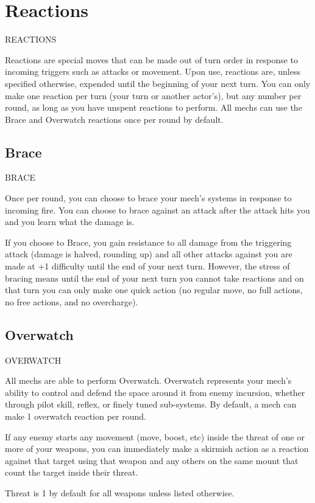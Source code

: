 \section{Reactions}
                                        REACTIONS  

Reactions are special moves that can be made out of turn order in response to incoming triggers  
such as attacks or movement. Upon use, reactions are, unless specified otherwise, expended  
until the beginning of your next turn. You can only make one reaction per turn (your turn or  
another actor’s), but any number per round, as long as you have unspent reactions to perform.  
All mechs can use the Brace and Overwatch reactions once per round by default.
 
\subsection{Brace}
                                                  BRACE  

Once per round, you can choose to brace your mech’s systems in response to incoming fire. You  
can choose to brace against an attack after the attack hits you and you learn what the damage  
is.
 

If you choose to Brace, you gain resistance to all damage from the triggering attack (damage is  
halved, rounding up) and all other attacks against you are made at +1 difficulty until the end of  
your next turn. However, the stress of bracing means until the end of your next turn you cannot  
take reactions and on that turn you can only make one quick action (no regular move, no full  
actions, no free actions, and no overcharge).
 \subsection{Overwatch}

                                              OVERWATCH  

All mechs are able to perform Overwatch. Overwatch represents your mech’s ability to control  
and defend the space around it from enemy incursion, whether through pilot skill, reflex, or finely  
tuned sub-systems. By default, a mech can make 1 overwatch reaction per round.
 

If any enemy starts any movement (move, boost, etc) inside the threat of one or more of your  
weapons, you can immediately make a skirmish action as a reaction against that target using  
that weapon and any others on the same mount that count the target inside their threat.
 

Threat is 1 by default for all weapons unless listed otherwise.